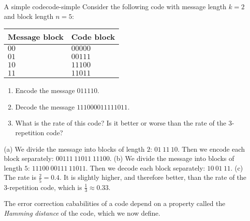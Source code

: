 \begin{example}{A simple code}{code-simple}
  Consider the following code with message length $k=2$ and block
  length $n=5$:
  \begin{center}
    \begin{tabular}{|l|l|}
      \hline
      Message block & Code block \\\hline
      $00$ & $00000$ \\
      $01$ & $00111$ \\
      $10$ & $11100$ \\
      $11$ & $11011$ \\\hline
    \end{tabular}
  \end{center}
  \begin{enumialphparenastyle}
    \begin{enumerate}
    \item Encode the message $011110$.
    \item Decode the message $111000011111011$.
    \item What is the rate of this code? Is it better or worse than
      the rate of the 3-repetition code?
    \end{enumerate}
  \end{enumialphparenastyle}
\end{example}

\begin{solution}
  (a) We divide the message into blocks of length $2$:
  $01~11~10$. Then we encode each block separately:
  $00111~11011~11100$. (b) We divide the message into blocks of length
  $5$: $11100~00111~11011$. Then we decode each block separately:
  $10~01~11$. (c) The rate is $\frac{2}{5}=0.4$. It is slightly
  higher, and therefore better, than the rate of the 3-repetition code,
  which is $\frac{1}{3}\approx 0.33$.
\end{solution}

The error correction cababilities of a code depend on a property
called the \textit{Hamming distance} of the code, which we now define.

